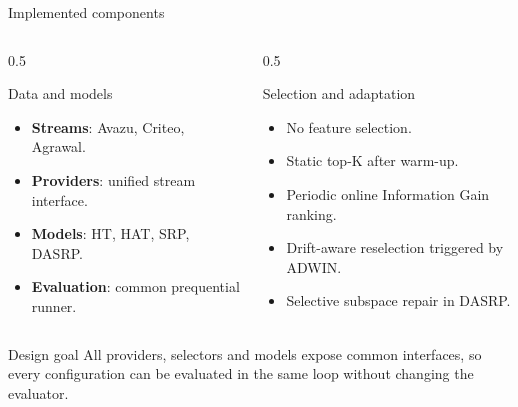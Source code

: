 \documentclass[aspectratio=169,xcolor=dvipsnames]{beamer}
\begin{document}
\begin{frame}{Implemented components}
\begin{columns}[T]
    \begin{column}{0.5\textwidth}
        \begin{block}{Data and models}
        \small
        \begin{itemize}
            \item \textbf{Streams}: Avazu, Criteo, Agrawal.
            \item \textbf{Providers}: unified stream interface.
            \item \textbf{Models}: HT, HAT, SRP, DASRP.
            \item \textbf{Evaluation}: common prequential runner.
        \end{itemize}
        \end{block}
    \end{column}

    \begin{column}{0.5\textwidth}
        \begin{block}{Selection and adaptation}
        \small
        \begin{itemize}
            \item No feature selection.
            \item Static top-K after warm-up.
            \item Periodic online Information Gain ranking.
            \item Drift-aware reselection triggered by ADWIN.
            \item Selective subspace repair in DASRP.
        \end{itemize}
        \end{block}
    \end{column}
\end{columns}

\vspace{0.2cm}
\begin{block}{Design goal}
\small
All providers, selectors and models expose common interfaces, so every configuration can be evaluated in the same loop without changing the evaluator.
\end{block}
\end{frame}
\end{document}
